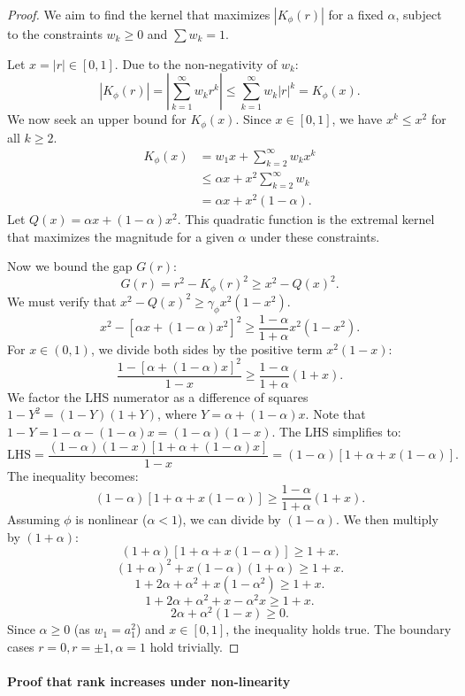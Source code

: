 \documentclass{article}
\numberwithin{figure}{section}
\begin{document}
\begin{proof}
We aim to find the kernel that maximizes $|K_\phi(r)|$ for a fixed $\alpha$, subject to the constraints $w_k \ge 0$ and $\sum w_k = 1$.

Let $x = |r| \in [0, 1]$. Due to the non-negativity of $w_k$:
\[
|K_\phi(r)| = |\sum_{k=1}^\infty w_k r^k| \le \sum_{k=1}^\infty w_k |r|^k = K_\phi(x).
\]
We now seek an upper bound for $K_\phi(x)$. Since $x \in [0, 1]$, we have $x^k \le x^2$ for all $k \ge 2$.
\begin{align*}
K_\phi(x) &= w_1 x + \sum_{k=2}^\infty w_k x^k \\
&\le \alpha x + x^2 \sum_{k=2}^\infty w_k \\
&= \alpha x + x^2 (1-\alpha).
\end{align*}
Let $Q(x) = \alpha x + (1-\alpha)x^2$. This quadratic function is the extremal kernel that maximizes the magnitude for a given $\alpha$ under these constraints.

Now we bound the gap $G(r)$:
\[
G(r) = r^2 - K_\phi(r)^2 \ge x^2 - Q(x)^2.
\]
We must verify that $x^2 - Q(x)^2 \ge \gamma_\phi x^2(1-x^2)$.
\[
x^2 - [\alpha x + (1-\alpha)x^2]^2 \ge \frac{1-\alpha}{1+\alpha} x^2 (1-x^2).
\]
For $x \in (0,1)$, we divide both sides by the positive term $x^2 (1-x)$:
\[
\frac{1 - [\alpha + (1-\alpha)x]^2}{1-x} \ge \frac{1-\alpha}{1+\alpha}(1+x).
\]
We factor the LHS numerator as a difference of squares $1-Y^2 = (1-Y)(1+Y)$, where $Y = \alpha + (1-\alpha)x$.
Note that $1-Y = 1-\alpha - (1-\alpha)x = (1-\alpha)(1-x)$.
The LHS simplifies to:
\[
\text{LHS} = \frac{(1-\alpha)(1-x) [1 + \alpha + (1-\alpha)x]}{1-x} = (1-\alpha)[1+\alpha + x(1-\alpha)].
\]
The inequality becomes:
\[
(1-\alpha)[1+\alpha + x(1-\alpha)] \ge \frac{1-\alpha}{1+\alpha}(1+x).
\]
Assuming $\phi$ is nonlinear ($\alpha < 1$), we can divide by $(1-\alpha)$. We then multiply by $(1+\alpha)$:
\[
(1+\alpha)[1+\alpha + x(1-\alpha)] \ge 1+x.
\]
\[
(1+\alpha)^2 + x(1-\alpha)(1+\alpha) \ge 1+x.
\]
\[
1 + 2\alpha + \alpha^2 + x(1-\alpha^2) \ge 1+x.
\]
\[
1 + 2\alpha + \alpha^2 + x - \alpha^2 x \ge 1+x.
\]
\[
2\alpha + \alpha^2(1-x) \ge 0.
\]
Since $\alpha \ge 0$ (as $w_1=a_1^2$) and $x \in [0, 1]$, the inequality holds true. The boundary cases $r=0, r=\pm 1, \alpha=1$ hold trivially.
\end{proof}

\paragraph{Proof that rank increases under non-linearity}
\end{document}
